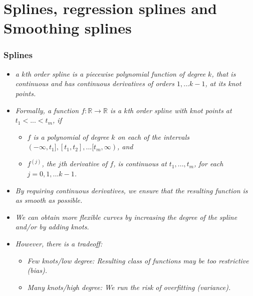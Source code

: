 \documentclass[11pt]{beamer}
\newcommand{\nologo}{\setbeamertemplate{logo}{}}
\begin{document}
\section{Splines, regression splines and Smoothing splines}
{\nologo
\begin{frame}
 \frametitle{Splines}
 \vspace{-.20cm}
{\footnotesize
\begin{itemize}[<+->]
\item {\it a $k$th order spline is a piecewise polynomial function of degree $k$, that is continuous
and has continuous derivatives of orders $1,...k-1$, at its knot points.}
\item {\it Formally, a function $f:\mathbb{R}\rightarrow\mathbb{R}$ is a $k$th order spline with knot points at $t_1< ... < t_m$, if}
 \begin{itemize}
 \item {\it $f$ is a polynomial of degree $k$ on each of the intervals $(-\infty,t_1],[t_1,t_2],...[t_m,\infty)$, and}
 \item  {\it $f^{(j)}$, the $j$th derivative of $f$, is continuous at $t_1,...,t_m$, for each $j= 0,1,...k-1$.}
  \end{itemize}
\item {\it By requiring continuous derivatives, we ensure that the resulting function is as smooth as possible.}
\item {\it We can obtain more flexible curves by increasing the degree of
the spline and/or by adding knots.}
\item {\it However, there is a tradeoff:}
\begin{itemize}
	\item {\it \footnotesize Few knots/low degree:  Resulting class of functions may be too
restrictive (bias).}
	\item {\it \footnotesize Many knots/high degree:  We run the risk of overfitting (variance).}
\end{itemize}
\end{itemize}

}


\vfill

\vfill

\end{frame}
}
\end{document}
